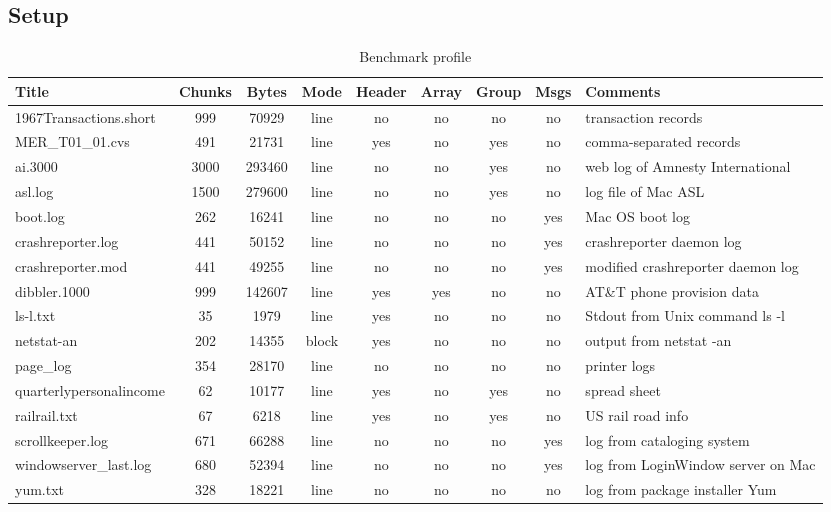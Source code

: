 \subsection{Setup}
\begin{table*}
\begin{center}
\begin{tabular}{|l|c|c|c|c|c|c|c|l|} \hline
Title		& Chunks & Bytes	& Mode  &Header	& Array	& Group & Msgs 	& Comments \\ \hline \hline
1967Transactions.short	& 999	& 70929	& line	& no	& no	& no	& no	& transaction records \\ \hline
MER\_T01\_01.cvs	& 491	& 21731 & line  & yes	& no	& yes	& no	& comma-separated records\\ \hline
ai.3000		& 3000		& 293460 & line	& no	& no	& yes	& no	& web log of Amnesty International \\ \hline
asl.log &	1500	& 279600	& line	& no	& no	& yes	& no	& log file of Mac ASL \\ \hline	
boot.log	& 262	& 16241		& line	& no	& no	& no	& yes	& Mac OS boot log \\ \hline
crashreporter.log	& 441	& 50152 & line	& no	& no	& no	& yes	& crashreporter daemon log \\ \hline
crashreporter.mod & 441	& 49255	& line	& no	& no	& no	& yes	& modified crashreporter daemon log \\ \hline
dibbler.1000	& 999	& 142607 	& line	& yes	& yes	& no	& no	& AT\&T phone provision data \\ \hline
ls-l.txt	& 35	& 1979		& line	& yes	& no	& no	& no	& Stdout from Unix command ls -l \\ \hline
netstat-an	& 202	& 14355		& block	& yes	& no	& no	& no	& output from netstat -an \\ \hline
page\_log	& 354	& 28170		& line	& no	& no	& no	& no	& printer logs \\ \hline
quarterlypersonalincome & 62	& 10177	& line	& yes	& no	& yes	& no	& spread sheet \\ \hline
railrail.txt	& 67	& 6218		& line	& yes	& no	& yes	& no	& US rail road info \\ \hline
scrollkeeper.log & 671	& 66288		& line	& no	& no	& no	& yes	& log from cataloging system \\ \hline
windowserver\_last.log & 680	& 52394	& line	& no	& no	& no	& yes	& log from LoginWindow server on Mac \\ \hline
yum.txt		& 328	& 18221		& line	& no	& no	& no	& no	& log from package installer Yum \\ \hline
\end{tabular}
\caption{Benchmark profile}
\end{center}
\end{table*}

